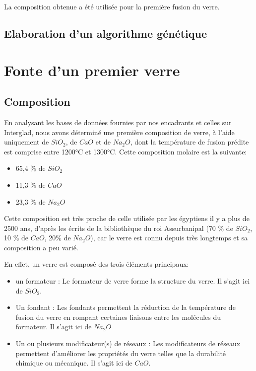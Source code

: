 \documentclass{article}
\begin{document}
La composition obtenue a été utilisée pour la première fusion du verre.

\subsection{Elaboration d'un algorithme génétique}

\section{Fonte d'un premier verre}
\subsection{Composition}

En analysant les bases de données fournies par nos encadrants et celles sur Interglad, nous avons déterminé une première composition de verre, à l'aide uniquement de $SiO_2$, de $CaO$ et de $Na_2O$, dont la température de fusion prédite est comprise entre 1200°C et 1300°C. Cette composition molaire est la suivante:

\begin{itemize}
    \item 65,4 \% de $SiO_2$
    \item 11,3 \% de $CaO$
    \item 23,3 \% de $Na_2O$
\end{itemize}

Cette composition est très proche de celle utilisée par les égyptiens il y a plus de 2500 ans, d’après les écrits de la bibliothèque du roi Assurbanipal (70 \% de $SiO_2$, 10 \% de $CaO$, 20\% de $Na_2O$), car le verre est connu depuis très longtemps et sa composition a peu varié. 

En effet, un verre est composé des trois éléments principaux:
\begin{itemize}
    \item un formateur : Le formateur de verre forme la structure du verre. Il s'agit ici de $SiO_2$.
    \item Un fondant : Les fondants permettent la réduction de la température de fusion du verre en rompant certaines liaisons entre les molécules du formateur. Il s'agit ici de $Na_2O$
    \item Un ou plusieurs modificateur(s) de réseaux : Les modificateurs de réseaux permettent d'améliorer les propriétés du verre telles que la durabilité chimique ou mécanique. Il s'agit ici de $CaO$.
\end{itemize}
\end{document}
